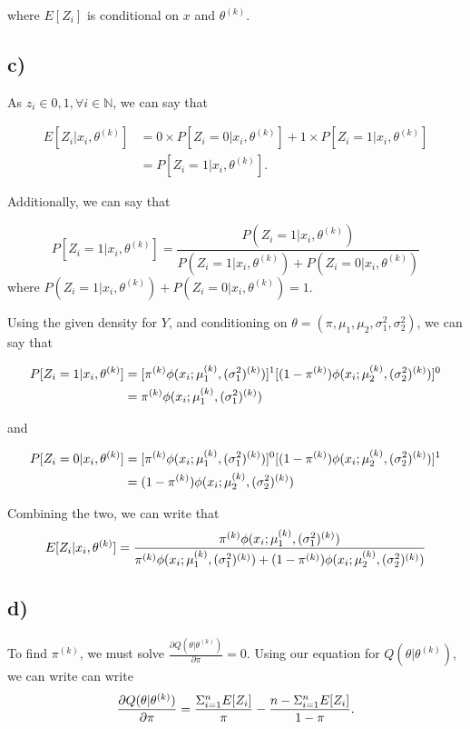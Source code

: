 \documentclass[]{article}
\begin{document}
where \(E[Z_i]\) is conditional on \(x\) and \(\theta^{(k)}\).

\subsection{c)}\label{c-1}

As \(z_i \in {0, 1}, \forall i \in \mathbb{N}\), we can say that

\begin{align*}
E[Z_i | x_i, \theta^{(k)}] &= 0 \times P[Z_i = 0 | x_i, \theta^{(k)}] + 1 \times P[Z_i = 1|x_i, \theta^{(k)}] \\
&= P[Z_i = 1|x_i, \theta^{(k)}].
\end{align*}

Additionally, we can say that

\[P[Z_i = 1|x_i, \theta^{(k)}] = \frac{P(Z_i=1| x_i, \theta^{(k)})}{P(Z_i=1 | x_i, \theta^{(k)}) + P(Z_i=0| x_i, \theta^{(k)})}
\] where
\({P(Z_i=1 | x_i, \theta^{(k)}) + P(Z_i=0| x_i, \theta^{(k)})} = 1\).

Using the given density for \(Y\), and conditioning on
\(\theta=(\pi, \mu_1, \mu_2, \sigma_1^2, \sigma_2^2)\), we can say that

\begin{align*}
P[Z_i = 1 | x_i, \theta^{(k)}] &= [\pi^{(k)}\phi(x_i; \mu_{1}^{(k)}, (\sigma_{1}^2)^{(k)})]^1 [(1- \pi^{(k)})\phi(x_i; \mu_{2}^{(k)}, (\sigma_{2}^2)^{(k)})]^{0} \\ &= \pi^{(k)}\phi(x_i; \mu_{1}^{(k)}, (\sigma_{1}^2)^{(k)})
\end{align*}

and

\begin{align*}
P[Z_i = 0 | x_i, \theta^{(k)}] &= [\pi^{(k)}\phi(x_i; \mu_{1}^{(k)}, (\sigma_{1}^2)^{(k)})]^0 [(1- \pi^{(k)})\phi(x_i; \mu_{2}^{(k)}, (\sigma_{2}^2)^{(k)})]^{1} \\ &=
(1- \pi^{(k)})\phi(x_i; \mu_{2}^{(k)}, (\sigma_{2}^2)^{(k)})
\end{align*}

Combining the two, we can write that \[
E[Z_i | x_i, \theta^{(k)}] = \frac{\pi^{(k)}\phi(x_i; \mu_{1}^{(k)}, (\sigma_{1}^2)^{(k)})}{\pi^{(k)}\phi(x_i; \mu_{1}^{(k)}, (\sigma_{1}^2)^{(k)}) + (1- \pi^{(k)})\phi(x_i; \mu_{2}^{(k)}, (\sigma_{2}^2)^{(k)})}
\]

\subsection{d)}\label{d}

To find \(\pi^{(k)}\), we must solve
\(\frac{\partial Q(\theta | \theta^{(k)})}{\partial \pi} = 0\). Using
our equation for \(Q(\theta | \theta^{(k)})\), we can write can write \[
\frac{\partial Q(\theta | \theta^{(k)})}{\partial \pi} = \frac{\Sigma_{i=1}^{n} E[Z_i]}{\pi} - \frac{n - \Sigma_{i=1}^{n} E[Z_i]}{1-\pi}.
\]
\end{document}

